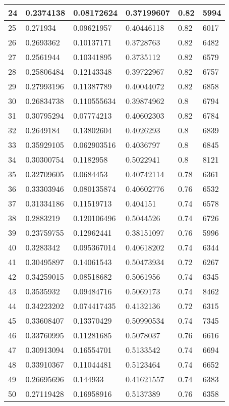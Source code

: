 \begin{longtable}{|l|l|l|l|l|l|}
24 & 0.2374138 & 0.08172624 & 0.37199607 & 0.82 & 5994 \\ \hline 
25 & 0.271934 & 0.09621957 & 0.40446118 & 0.82 & 6017 \\ \hline 
26 & 0.2693362 & 0.10137171 & 0.3728763 & 0.82 & 6482 \\ \hline 
27 & 0.2561944 & 0.10341895 & 0.3735112 & 0.82 & 6579 \\ \hline 
28 & 0.25806484 & 0.12143348 & 0.39722967 & 0.82 & 6757 \\ \hline 
29 & 0.27993196 & 0.11387789 & 0.40044072 & 0.82 & 6858 \\ \hline 
30 & 0.26834738 & 0.110555634 & 0.39874962 & 0.8 & 6794 \\ \hline 
31 & 0.30795294 & 0.07774213 & 0.40602303 & 0.82 & 6784 \\ \hline 
32 & 0.2649184 & 0.13802604 & 0.4026293 & 0.8 & 6839 \\ \hline 
33 & 0.35929105 & 0.062903516 & 0.4036797 & 0.8 & 6845 \\ \hline 
34 & 0.30300754 & 0.1182958 & 0.5022941 & 0.8 & 8121 \\ \hline 
35 & 0.32709605 & 0.0684453 & 0.40742114 & 0.78 & 6361 \\ \hline 
36 & 0.33303946 & 0.080135874 & 0.40602776 & 0.76 & 6532 \\ \hline 
37 & 0.31334186 & 0.11519713 & 0.404151 & 0.74 & 6578 \\ \hline 
38 & 0.2883219 & 0.120106496 & 0.5044526 & 0.74 & 6726 \\ \hline 
39 & 0.23759755 & 0.12962441 & 0.38151097 & 0.76 & 5996 \\ \hline 
40 & 0.3283342 & 0.095367014 & 0.40618202 & 0.74 & 6344 \\ \hline 
41 & 0.30495897 & 0.14061543 & 0.50473934 & 0.72 & 6267 \\ \hline 
42 & 0.34259015 & 0.08518682 & 0.5061956 & 0.74 & 6345 \\ \hline 
43 & 0.3535932 & 0.09484716 & 0.5069173 & 0.74 & 8462 \\ \hline 
44 & 0.34223202 & 0.074417435 & 0.4132136 & 0.72 & 6315 \\ \hline 
45 & 0.33608407 & 0.13370429 & 0.50990534 & 0.74 & 7345 \\ \hline 
46 & 0.33760995 & 0.11281685 & 0.5078037 & 0.76 & 6616 \\ \hline 
47 & 0.30913094 & 0.16554701 & 0.5133542 & 0.74 & 6694 \\ \hline 
48 & 0.33910367 & 0.11044481 & 0.5123464 & 0.74 & 6652 \\ \hline 
49 & 0.26695696 & 0.144933 & 0.41621557 & 0.74 & 6383 \\ \hline 
50 & 0.27119428 & 0.16958916 & 0.5137389 & 0.76 & 6358 \\ \hline 
\end{longtable}